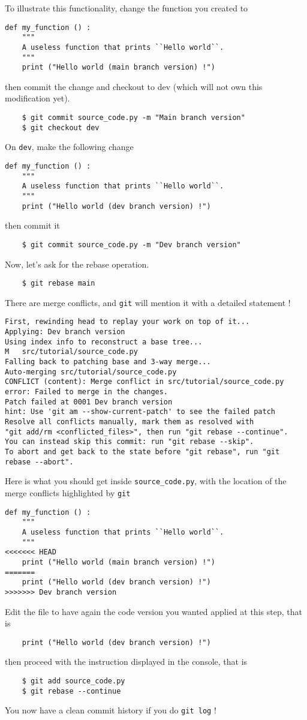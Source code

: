 \documentclass{article}
\begin{document}
To illustrate this functionality, change the function you created to 
\begin{lstlisting}
def my_function () :
    """
    A useless function that prints ``Hello world``.
    """
    print ("Hello world (main branch version) !")
\end{lstlisting}
then commit the change and checkout to dev (which will not own this modification yet).
\begin{lstlisting}
    $ git commit source_code.py -m "Main branch version"
    $ git checkout dev
\end{lstlisting}
On \texttt{dev}, make the following change
\begin{lstlisting}
def my_function () :
    """
    A useless function that prints ``Hello world``.
    """
    print ("Hello world (dev branch version) !")
\end{lstlisting}
then commit it
\begin{lstlisting}
    $ git commit source_code.py -m "Dev branch version"
\end{lstlisting}
Now, let's ask for the rebase operation.
\begin{lstlisting}
    $ git rebase main
\end{lstlisting}
There are merge conflicts, and \texttt{git} will mention it with a detailed statement !
\begin{lstlisting}
First, rewinding head to replay your work on top of it...
Applying: Dev branch version
Using index info to reconstruct a base tree...
M	src/tutorial/source_code.py
Falling back to patching base and 3-way merge...
Auto-merging src/tutorial/source_code.py
CONFLICT (content): Merge conflict in src/tutorial/source_code.py
error: Failed to merge in the changes.
Patch failed at 0001 Dev branch version
hint: Use 'git am --show-current-patch' to see the failed patch
Resolve all conflicts manually, mark them as resolved with
"git add/rm <conflicted_files>", then run "git rebase --continue".
You can instead skip this commit: run "git rebase --skip".
To abort and get back to the state before "git rebase", run "git rebase --abort".
\end{lstlisting}
Here is what you should get inside \texttt{source\_code.py}, with the location of the merge conflicts highlighted by \texttt{git}
\begin{lstlisting}
def my_function () :
    """
    A useless function that prints ``Hello world``.
    """
<<<<<<< HEAD
    print ("Hello world (main branch version) !")
=======
    print ("Hello world (dev branch version) !")
>>>>>>> Dev branch version
\end{lstlisting}
Edit the file to have again the code version you wanted applied at this step, that is 
\begin{lstlisting}
    print ("Hello world (dev branch version) !")
\end{lstlisting}
then proceed with the instruction displayed in the console, that is
\begin{lstlisting}
    $ git add source_code.py
    $ git rebase --continue
\end{lstlisting}
You now have a clean commit history if you do \texttt{git log} !
\end{document}
